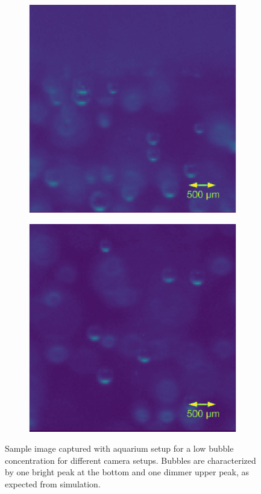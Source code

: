 \begin{figure}[h]
			\begin{subfigure}[t]{.4\textwidth}
				\centering
				\includegraphics[scale=0.45]{images/aq_result_surf_small_1.png}				
				\caption{}
				\label{subfig:low_c}				
			\end{subfigure}\hfill
			\begin{subfigure}[t]{.4\textwidth}
				\centering
				\includegraphics[scale=0.45]{images/aq_result_surf_small_2.png}
				\caption{}
				\label{subfig:low_d}				
			\end{subfigure}\hfill			
			\caption{Sample image captured with aquarium setup for a low bubble concentration for different camera setups. Bubbles are characterized by one bright peak at the bottom and one dimmer upper peak, as expected from simulation.}			
			\label{fig:aqauarium_result}
		\end{figure}
					
